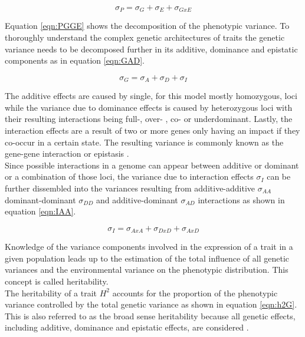\begin{equation}
 \sigma_{P} = \sigma_{G} + \sigma_{E} + \sigma_{GxE}
 \label{eqn:PGGE}
\end{equation}

Equation \ref{eqn:PGGE} shows the decomposition of the phenotypic variance. To thoroughly
understand the complex genetic architectures of traits the genetic variance needs to be
decomposed further in its additive, dominance and epistatic components as in equation
\ref{eqn:GAD}.

\begin{equation}
 \sigma_{G} = \sigma_{A} + \sigma_{D} + \sigma_{I}
 \label{eqn:GAD}
\end{equation}

The additive effects are caused by single, for this model mostly homozygous, loci while
the variance due to dominance effects is caused by heterozygous loci with their
resulting interactions being full-, over- , co- or underdominant. Lastly, the interaction
effects are a result of two or more genes only having an impact if they co-occur in a
certain state. The resulting variance is commonly known as the gene-gene interaction or epistasis \cite{falconer1996}. \\
Since possible interactions in a genome can appear between additive or dominant or a
combination of those loci, the variance due to interaction effects $\sigma_{I}$ can be
further dissembled into the variances resulting from additive-additive $\sigma_{AA}$
dominant-dominant $\sigma_{DD}$ and additive-dominant $\sigma_{AD}$ interactions as shown
in equation \ref{eqn:IAA}.

\begin{equation}
 \sigma_{I} = \sigma_{AxA} + \sigma_{DxD} + \sigma_{AxD}
 \label{eqn:IAA}
\end{equation}

Knowledge of the variance components involved in the expression of a trait in a given
population leads up to the estimation of the total influence of all genetic variances and
the environmental variance on the phenotypic distribution. This concept is called
heritability. \\
The heritability of a trait $H^2$ accounts for the proportion of the phenotypic variance
controlled by the total genetic variance as shown in equation \ref{eqn:h2G}. This is also
referred to as the broad sense heritability because all genetic effects, including additive,
dominance and epistatic effects, are considered \cite{brooker1999genetics}.

